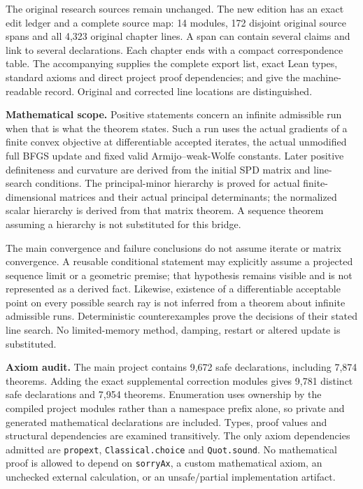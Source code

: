 The original research sources remain unchanged. The new edition has an exact edit ledger and a complete source map: 14 modules, 172 disjoint original source spans and all 4,323 original chapter lines. A span can contain several claims and link to several declarations. Each chapter ends with a compact correspondence table. The accompanying  supplies the complete export list, exact Lean types, standard axioms and direct project proof dependencies;  and  give the machine-readable record. Original and corrected line locations are distinguished.

\textbf{Mathematical scope.} Positive statements concern an infinite admissible run when that is what the theorem states. Such a run uses the actual gradients of a finite convex objective at differentiable accepted iterates, the actual unmodified full BFGS update and fixed valid Armijo--weak-Wolfe constants. Later positive definiteness and curvature are derived from the initial SPD matrix and line-search conditions. The principal-minor hierarchy is proved for actual finite-dimensional matrices and their actual principal determinants; the normalized scalar hierarchy is derived from that matrix theorem. A sequence theorem assuming a hierarchy is not substituted for this bridge.

The main convergence and failure conclusions do not assume iterate or matrix convergence. A reusable conditional statement may explicitly assume a projected sequence limit or a geometric premise; that hypothesis remains visible and is not represented as a derived fact. Likewise, existence of a differentiable acceptable point on every possible search ray is not inferred from a theorem about infinite admissible runs. Deterministic counterexamples prove the decisions of their stated line search. No limited-memory method, damping, restart or altered update is substituted.

\textbf{Axiom audit.} The main project contains 9,672 safe declarations, including 7,874 theorems. Adding the exact supplemental correction modules gives 9,781 distinct safe declarations and 7,954 theorems. Enumeration uses ownership by the compiled project modules rather than a namespace prefix alone, so private and generated mathematical declarations are included. Types, proof values and structural dependencies are examined transitively. The only axiom dependencies admitted are \texttt{propext}, \texttt{Classical.choice} and \texttt{Quot.sound}. No mathematical proof is allowed to depend on \texttt{sorryAx}, a custom mathematical axiom, an unchecked external calculation, or an unsafe/partial implementation artifact.

